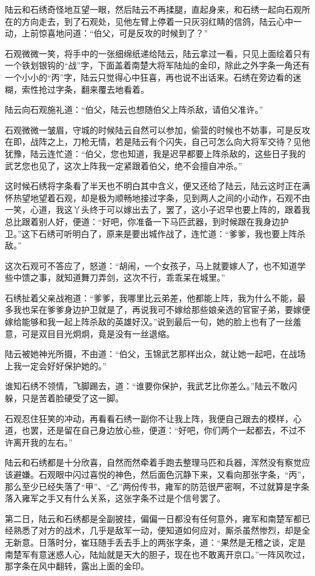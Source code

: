 陆云和石绣奇怪地互望一眼，然后陆云不再揉腿，直起身来，和石绣一起向石观所在的方向走去，到了石观处，见他左臂上停着一只灰羽红睛的信鸽，陆云心中一动，上前惊喜地问道：“伯父，可是反攻的时候到了？”

石观微微一笑，将手中的一张细绵纸递给陆云，陆云拿过一看，只见上面绘着只有一个铁划银钩的“战”字，下面盖着南楚大将军陆灿的金印，除此之外字条一角还有一个小小的“丙”字，陆云只觉得心中狂喜，再也说不出话来。石绣在旁边看的迷糊，索性抢过字条，翻来覆去地看着。

陆云向石观施礼道：“伯父，陆云也想随伯父上阵杀敌，请伯父准许。”

石观微微一皱眉，守城的时候陆云自然可以参加，偷营的时候也不妨事，可是反攻在即，战阵之上，刀枪无情，若是陆云有个闪失，自己可怎么向大将军交待？见他犹豫，陆云连忙道：“伯父，您也知道，我是迟早都要上阵杀敌的，这些日子我的武艺您也见了，这次上阵我一定紧跟着伯父，绝不会擅自冲杀。”

这时候石绣将字条看了半天也不明白其中含义，便又还给了陆云，陆云这时正在满怀热望地望着石观，却是极为顺畅地接过字条，见到两人之间的小动作，石观不由一笑，心道，我这丫头终于可以嫁出去了，罢了，这小子迟早也要上阵的，跟着我总比跟着别人好，便道：“好吧，你准备一下马匹武器，到时候跟在我身边护卫。”这下石绣可听明白了，原来是要出城作战了，连忙道：“爹爹，我也要上阵杀敌。”

这次石观可不答应了，怒道：“胡闹，一个女孩子，马上就要嫁人了，也不知道学些中馈之事，就知道舞刀弄剑，这次不行，乖乖呆在城里。”

石绣扯着父亲战袍道：“爹爹，我哪里比云弟差，他都能上阵，我为什么不能，最多我也呆在爹爹身边护卫就是了，再说我可不嫁给那些娘亲选的官宦子弟，要嫁便嫁给能够和我一起上阵杀敌的英雄好汉。”说到最后一句，她的脸上也有了一丝羞意，可是双目目光炯炯，竟是没有一丝退缩。

陆云被她神光所摄，不由道：“伯父，玉锦武艺那样出众，就让她一起吧，在战场上我一定会好好保护她的。”

谁知石绣不领情，飞脚踢去，道：“谁要你保护，我武艺比你差么。”陆云不敢闪躲，只是苦着脸硬受了这一脚。

石观忍住狂笑的冲动，再看看石绣一副你不让我上阵，我便自己跟去的模样，心道，也罢，还是留在自己身边放心些，便道：“好吧，你们两个一起都去，不过不许离开我的左右。”

陆云和石绣都是十分欣喜，自然而然牵着手跑去整理马匹和兵器，浑然没有察觉应该避嫌。石观眼中闪过喜悦的神色，然后面色沉静下来，又看向那张字条，“丙”，那么至少已经失落了“甲”、“乙”两份传书，雍军的防范很严密啊，不过就算是字条落入雍军之手又有什么关系，这张字条不过是个信号罢了。

第二日，陆云和石绣都是全副披挂，偏偏一日都没有任何意外，雍军和南楚军都已经熟悉了对方的战术，几乎是敌军一动，便知道如何应对，厮杀虽然惨烈，却是全无新意。日落时分，崔珏随手丢去手上的两张字条，道：“果然是无稽之谈，定是南楚军有意迷惑人心，陆灿就是天大的胆子，现在也不敢离开京口。”一阵风吹过，那字条在风中翻转，露出上面的金印。

